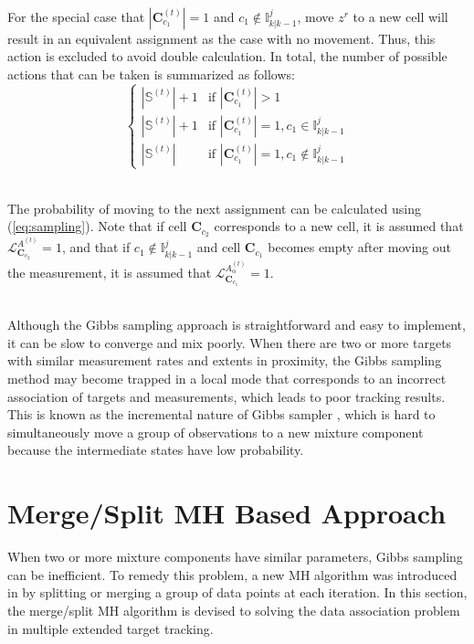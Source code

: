 ~\\
For the special case that $|\mathbf{C}_{c_1}^{(t)}|=1$ and $c_1\notin\mathbb{I}^j_{k|k-1}$, move $z^r$ to a new cell will result in an equivalent assignment as the case with no movement. Thus, this action is excluded to avoid double calculation. In total, the number of possible actions that can be taken is summarized as follows:
$$\begin{cases}
|\mathbb{S}^{(t)}|+1 & \text{if   } |\mathbf{C}_{c_1}^{(t)}|>1 \\
|\mathbb{S}^{(t)}|+1 & \text{if   } |\mathbf{C}_{c_1}^{(t)}|=1, c_1\in\mathbb{I}^j_{k|k-1} \\
|\mathbb{S}^{(t)}| & \text{if   } |\mathbf{C}_{c_1}^{(t)}|=1, c_1\notin\mathbb{I}^j_{k|k-1}
\end{cases}$$

~\\
The probability of moving to the next assignment can be calculated using (\ref{eq:sampling}). Note that if cell $\mathbf{C}_{c_2}$ corresponds to a new cell, it is assumed that $\mathcal{L}^{A^{(t)}}_{\mathbf{C}_{c_2}} = 1$, and that if $c_1\notin\mathbb{I}^j_{k|k-1}$ and cell $\mathbf{C}_{c_1}$
becomes empty after moving out the measurement, it is assumed that $\mathcal{L}^{A^{(t)}_{\alpha}}_{\mathbf{C}_{c_1}} = 1$.

~\\
Although the Gibbs sampling approach is straightforward and easy to implement, it can be slow to converge and mix poorly. When there are two or more targets with similar measurement rates and extents in proximity, the Gibbs sampling method may become trapped in a local mode that corresponds to an incorrect association of targets and measurements, which leads to poor tracking results. This is known as the incremental nature of Gibbs sampler \cite{gibbspoor}, which is hard to simultaneously move a group of observations to a new mixture component because the intermediate states have low probability. 


\section{Merge/Split MH Based Approach}
When two or more mixture components have similar parameters, Gibbs sampling can be inefficient. To remedy this problem, a new MH algorithm was introduced in \cite{mergesplit} by splitting or merging a group of data points at each iteration. In this section, the merge/split MH algorithm is devised to solving the data association problem in multiple extended target tracking. 

